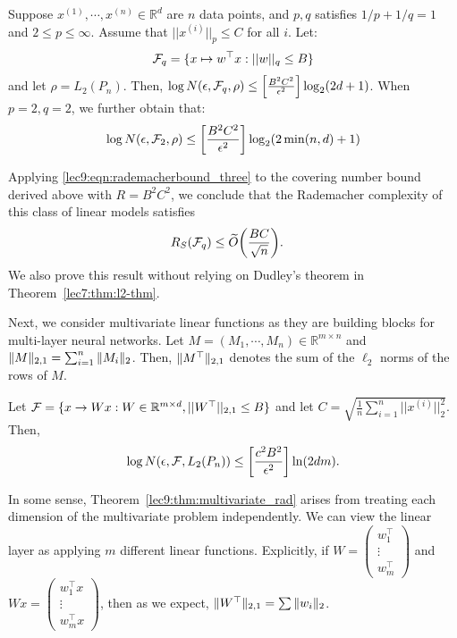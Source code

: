 \begin{theorem} \label{lec9:thm:univariate_rad}
	Suppose $x^{(1)}, \cdots, x^{(n)} \in \mathbb{R}^d$ are $n$ data points, and $p, q$ satisfies $1/p + 1/q = 1$ and $2 \le p \le \infty$. Assume that $||x^{(i)}||_p \le C$ for all $i$. Let:
	\begin{align}
	\mathcal F_q = \{x \mapsto w^\top x : ||w||_q \le B\}
	\end{align}
	and let $\rho = L_2(P_n)$. Then, $\log N(\epsilon, \mathcal F_q, \rho) \le \left [\frac{B^2C^2}{\epsilon^2}\right ] \log_2 (2d + 1)$. When $p = 2, q = 2$, we further obtain that:
	\begin{align}
	\log N(\epsilon, \mathcal F_2, \rho) \le \left [\frac{B^2C^2}{\epsilon^2} \right ] \log_2 (2 \min (n, d ) + 1)
	\end{align}
\end{theorem}
\begin{remark}
	Applying \eqref{lec9:eqn:rademacherbound_three} to the covering number bound derived above with $R = B^2C^2$, we conclude that the Rademacher complexity of this class of linear models satisfies
	\begin{align}
	R_S(\mathcal F_q) &\le \widetilde{O}{\left( \frac{BC}{\sqrt{n}} \right)}.
	\end{align} 
	We also prove this result without relying on Dudley's theorem in Theorem~\ref{lec7:thm:l2-thm}.
\end{remark}
Next, we consider multivariate linear functions as they are building blocks for multi-layer neural networks. Let $M = (M_1, \cdots, M_n) \in \mathbb{R}^{m \times n}$ and $\|M\|_{2,1} = \sum_{i = 1}^n \|M_i\|_2$. Then, $\|M^\top\|_{2,1}$ denotes the sum of the $\ell_2$ norms of the rows of $M$. 
\begin{theorem}\label{lec9:thm:multivariate_rad}
	Let $\mathcal F = \{x \to Wx : W \in \mathbb{R}^{m \times d}, ||W^\top||_{2, 1} \le B\}$ and let $C = \sqrt{\frac{1}{n} \sum_{i = 1}^n ||x^{(i)}||_2^2}$. Then, 
	\begin{equation}
	\log N(\epsilon, \mathcal F, L_2(P_n)) \le \left [\frac{c^2B^2}{\epsilon^2} \right ] \ln (2dm).
	\end{equation}
\end{theorem}
\begin{remark}
	In some sense, Theorem~\ref{lec9:thm:multivariate_rad} arises from treating each dimension of the multivariate problem independently. We can view the linear layer as applying $m$ different linear functions. Explicitly, if $W = \begin{pmatrix} w_1^\top \\ \vdots \\ w_m^\top \end{pmatrix}$ and $Wx = \begin{pmatrix} w_1^\top x \\ \vdots \\ w_m^\top x \end{pmatrix}$, then as we expect, $\|W^\top\|_{2,1} = \sum \|w_i\|_2$.
\end{remark}



